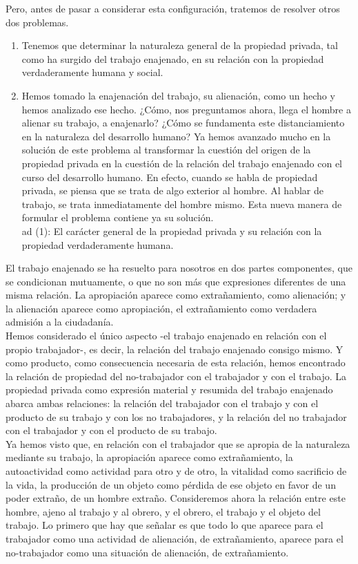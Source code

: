 Pero, antes de pasar a considerar esta configuración, tratemos de resolver otros dos problemas.

\begin{enumerate}[(1)]
    \item Tenemos que determinar la naturaleza general de la propiedad privada, tal como ha surgido del trabajo enajenado, en su relación con la propiedad verdaderamente humana y social.
    \item Hemos tomado la enajenación del trabajo, su alienación, como un hecho y hemos analizado ese hecho. ¿Cómo, nos preguntamos ahora, llega el hombre a alienar su trabajo, a enajenarlo? ¿Cómo se fundamenta este distanciamiento en la naturaleza del desarrollo humano? Ya hemos avanzado mucho en la solución de este problema al transformar la cuestión del origen de la propiedad privada en la cuestión de la relación del trabajo enajenado con el curso del desarrollo humano. En efecto, cuando se habla de propiedad privada, se piensa que se trata de algo exterior al hombre. Al hablar de trabajo, se trata inmediatamente del hombre mismo. Esta nueva manera de formular el problema contiene ya su solución. \\
ad (1): El carácter general de la propiedad privada y su relación con la propiedad verdaderamente humana.
\end{enumerate}

El trabajo enajenado se ha resuelto para nosotros en dos partes componentes, que se condicionan mutuamente, o que no son más que expresiones diferentes de una misma relación. La apropiación aparece como extrañamiento, como alienación; y la alienación aparece como apropiación, el extrañamiento como verdadera admisión a la ciudadanía.\\

Hemos considerado el único aspecto -el trabajo enajenado en relación con el propio trabajador-, es decir, la relación del trabajo enajenado consigo mismo. Y como producto, como consecuencia necesaria de esta relación, hemos encontrado la relación de propiedad del no-trabajador con el trabajador y con el trabajo. La propiedad privada como expresión material y resumida del trabajo enajenado abarca ambas relaciones: la relación del trabajador con el trabajo y con el producto de su trabajo y con los no trabajadores, y la relación del no trabajador con el trabajador y con el producto de su trabajo.\\

Ya hemos visto que, en relación con el trabajador que se apropia de la naturaleza mediante su trabajo, la apropiación aparece como extrañamiento, la autoactividad como actividad para otro y de otro, la vitalidad como sacrificio de la vida, la producción de un objeto como pérdida de ese objeto en favor de un poder extraño, de un hombre extraño. Consideremos ahora la relación entre este hombre, ajeno al trabajo y al obrero, y el obrero, el trabajo y el objeto del trabajo. Lo primero que hay que señalar es que todo lo que aparece para el trabajador como una actividad de alienación, de extrañamiento, aparece para el no-trabajador como una situación de alienación, de extrañamiento.\\

